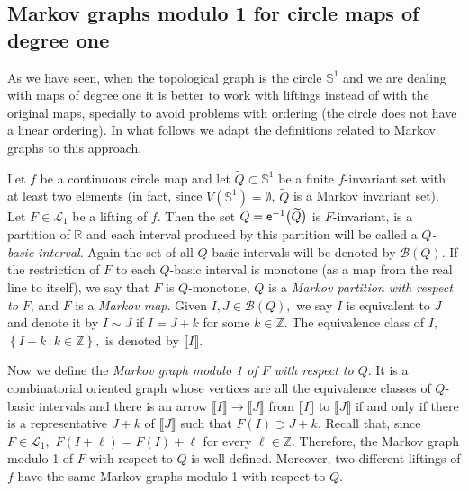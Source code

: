 \documentclass[a4paper, 11pt]{amsart}
\numberwithin{equation}{section}
\theoremstyle{customnumberedtheorem}
\theoremstyle{definitionwithbfnote}
\newcommand{\Z}{\ensuremath{\mathbb{Z}}}
\newcommand{\R}{\ensuremath{\mathbb{R}}}
\newcommand{\SI}{\ensuremath{\mathbb{S}^1}}
\DeclareMathOperator{\eexp}{\textsf{\upshape e}}
\newcommand{\dol}[1][1]{\ensuremath{\mathcal{L}_{#1}}}
\newcommand{\set}[2]{\ensuremath{\left\{#1 \,\colon #2\right\}}}
\newcommand{\BIclass}[1]{\ensuremath{\llbracket #1\rrbracket}}
\def\calB{\mathcal{B}}
\newcommand{\SBI}[1][Q]{\ensuremath{\calB(#1)}}
\begin{document}
\subsection{Markov graphs modulo 1 for circle maps of degree one}
As we have seen, when the topological graph is the circle $\SI$ and
we are dealing with maps of degree one it is better to work with
liftings instead of with the original maps, specially to avoid problems
with ordering (the circle does not have a linear ordering).
In what follows we adapt the definitions related to Markov graphs
to this approach.

Let $f$ be a continuous circle map and let $\widetilde{Q} \subset \SI$
be a finite $f$-invariant set with at least two elements
(in fact, since $V(\SI) = \emptyset$, $\widetilde{Q}$ is a Markov invariant set).
Let $F\in \dol$ be a lifting of $f.$
Then the set $Q = \eexp^{-1}\bigl(\widetilde{Q}\bigr)$ is $F$-invariant,
is a partition of $\R$ and each interval produced by this
partition will be called a \emph{$Q$-basic interval\/}.
Again the set of all $Q$-basic intervals will be denoted by \SBI.
If the restriction of $F$ to each $Q$-basic interval is monotone
(as a map from the real line to itself),
we say that $F$ is $Q$-monotone,
$Q$ is a \emph{Markov partition with respect to $F$},
and $F$ is a \emph{Markov map}.
Given $I,J \in \SBI,$  we say $I$
is equivalent to $J$ and denote it by $I \sim J$
if $I = J + k$ for some $k \in \Z.$
The equivalence class of $I,$ $\set{I + k}{k \in\Z},$ is denoted by $\BIclass{I}.$

Now we define the \emph{Markov graph modulo 1 of $F$ with respect to $Q$}.
It is a combinatorial oriented graph whose vertices are
all the equivalence classes of $Q$-basic intervals and
there is an arrow $\BIclass{I} \longrightarrow \BIclass{J}$ from $\BIclass{I}$ to $\BIclass{J}$
if and only if there is a representative $J+k$ of $\BIclass{J}$ such that
$F(I) \supset J+k.$ Recall that, since $F \in \dol,$
$F(I + \ell) = F(I) + \ell$ for every $\ell \in \Z.$
Therefore, the Markov graph modulo 1 of $F$ with respect to $Q$ is well defined.
Moreover, two different liftings of $f$ have the same
Markov graphs modulo 1 with respect to $Q$.
\end{document}
